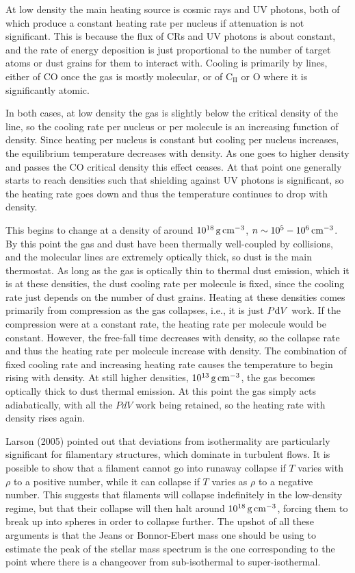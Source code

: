 \documentclass[a4paper,10pt]{article}
\begin{document}
{\noindent}At low density the main heating source is cosmic rays and UV photons, both of which produce a constant heating rate per nucleus if attenuation is not significant. This is because the flux of CRs and UV photons is about constant, and the rate of energy deposition is just proportional to the number of target atoms or dust grains for them to interact with. Cooling is primarily by lines, either of CO once the gas is mostly molecular, or of C$_\mathrm{II}$ or O where it is significantly atomic.

{\noindent}In both cases, at low density the gas is slightly below the critical density of the line, so the cooling rate per nucleus or per molecule is an increasing function of density. Since heating per nucleus is constant but cooling per nucleus increases, the equilibrium temperature decreases with density. As one goes to higher density and passes the CO critical density this effect ceases. At that point one generally starts to reach densities such that shielding against UV photons is significant, so the heating rate goes down and thus the temperature continues to drop with density.

{\noindent}This begins to change at a density of around $10^{18}\,{\rm g\,cm^{-3}}$, $n\sim10^5-10^6\,{\rm cm^{-3}}$. By this point the gas and dust have been thermally well-coupled by collisions, and the molecular lines are extremely optically thick, so dust is the main thermostat. As long as the gas is optically thin to thermal dust emission, which it is at these densities, the dust cooling rate per molecule is fixed, since the cooling rate just depends on the number of dust grains. Heating at these densities comes primarily from compression as the gas collapses, i.e., it is just $P{\rm d}V$ work. If the compression were at a constant rate, the heating rate per molecule would be constant. However, the free-fall time decreases with density, so the collapse rate and thus the heating rate per molecule increase with density. The combination of fixed cooling rate and increasing heating rate causes the temperature to begin rising with density. At still higher densities, $10^{13}\,{\rm g\,cm^{-3}}$, the gas becomes optically thick to dust thermal emission. At this point the gas simply acts adiabatically, with all the $PdV$ work being retained, so the heating rate with density rises again.

{\noindent}Larson (2005) pointed out that deviations from isothermality are particularly significant for filamentary structures, which dominate in turbulent flows. It is possible to show that a filament cannot go into runaway collapse if $T$ varies with $\rho$ to a positive number, while it can collapse if $T$ varies as $\rho$ to a negative number. This suggests that filaments will collapse indefinitely in the low-density regime, but that their collapse will then halt around $10^{18}\,{\rm g\,cm^{-3}}$, forcing them to break up into spheres in order to collapse further. The upshot of all these arguments is that the Jeans or Bonnor-Ebert mass one should be using to estimate the peak of the stellar mass spectrum is the one corresponding to the point where there is a changeover from sub-isothermal to super-isothermal.
\end{document}
